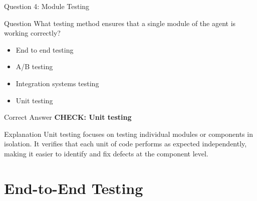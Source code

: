 \documentclass[aspectratio=169]{beamer}
\begin{document}
\begin{frame}{Question 4: Module Testing}
  \begin{block}{Question}
    What testing method ensures that a single module of the agent is working correctly?
  \end{block}
  
  
  
  \begin{itemize}
    \item End to end testing
    \item A/B testing
    \item Integration systems testing
    \item Unit testing
  \end{itemize}
  
  
  
  \begin{alertblock}{Correct Answer}
    \textcolor{GoogleGreen}{\textbf{CHECK: Unit testing}}
  \end{alertblock}
  
  \vspace{0.2cm}
  
  \begin{block}{Explanation}
    \small
    Unit testing focuses on testing individual modules or components in isolation. It verifies that each unit of code performs as expected independently, making it easier to identify and fix defects at the component level.
  \end{block}
\end{frame}

\section{End-to-End Testing}
\end{document}
